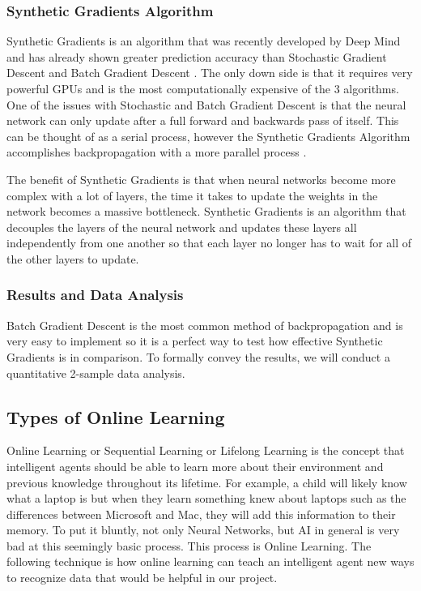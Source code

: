 \documentclass[draftclsnofoot, onecolumn, 10pt, compsoc]{IEEEtran}
\begin{document}
\subsubsection{Synthetic Gradients Algorithm}
Synthetic Gradients is an algorithm that was recently developed by Deep Mind and has already shown greater prediction accuracy than Stochastic Gradient Descent and Batch Gradient Descent \cite{Raval}. The only down side is that it requires very powerful GPUs and is the most computationally expensive of the 3 algorithms. One of the issues with Stochastic and Batch Gradient Descent is that the neural network can only update after a full forward and backwards pass of itself. This can be thought of as a serial process, however the Synthetic Gradients Algorithm accomplishes backpropagation with a more parallel process \cite{Czarnecki}. 

The benefit of Synthetic Gradients is that when neural networks become more complex with a lot of layers, the time it takes to update the weights in the network becomes a massive bottleneck. Synthetic Gradients is an algorithm that decouples the layers of the neural network and updates these layers all independently from one another so that each layer no longer has to wait for all of the other layers to update.

\subsubsection{Results and Data Analysis}
Batch Gradient Descent is the most common method of backpropagation and is very easy to implement so it is a perfect way to test how effective Synthetic Gradients is in comparison. To formally convey the results, we will conduct a quantitative 2-sample data analysis.

\subsection{Types of Online Learning}
Online Learning or Sequential Learning or Lifelong Learning is the concept that intelligent agents should be able to learn more about their environment and previous knowledge throughout its lifetime. For example, a child will likely know what a laptop is but when they learn something knew about laptops such as the differences between Microsoft and Mac, they will add this information to their memory. To put it bluntly, not only Neural Networks, but AI in general is very bad at this seemingly basic process. This process is Online Learning. The following technique is how online learning can teach an intelligent agent new ways to recognize data that would be helpful in our project.
\end{document}
